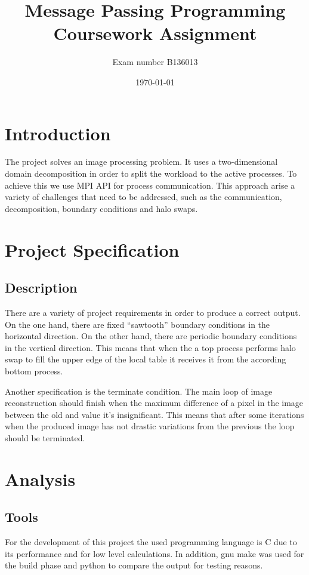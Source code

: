 \documentclass[12pt,a4paper]{article}
\newcommand{\sectionVspacing}{\vspace{15pt}}
\begin{document}
\title{Message Passing Programming Coursework Assignment}
\author{Exam number B136013}
\date{\today}

\makeEPCCtitle

\thispagestyle{empty}

\newpage
\clearpage

\tableofcontents

\newpage
\clearpage

\section{Introduction}
The project solves an image processing problem. It uses a two-dimensional domain decomposition in order to split the workload to the active processes. To achieve this we use MPI API for process communication. This approach arise a variety of challenges that need to be addressed, such as the communication, decomposition, boundary conditions and halo swaps.

\sectionVspacing

\section{Project Specification}
\subsection{Description}
There are a variety of project requirements in order to produce a correct output. On the one hand, there are fixed “sawtooth” boundary conditions in the horizontal direction. On the other hand, there are periodic boundary conditions in the vertical direction. This means that when the a top process performs halo swap to fill the upper edge of the local table it receives it from the according bottom process.

Another specification is the terminate condition. The main loop of image reconstruction should finish when the maximum difference of a pixel in the image between the old and value it's insignificant. This means that after some iterations when the produced image has not drastic variations from the previous the loop should be terminated.

\sectionVspacing

\section{Analysis}

	\subsection{Tools}
	For the development of this project the used programming language is C due to its performance and for low level calculations. In addition, gnu make was used for the build phase and python to compare the output for testing reasons.
\end{document}
